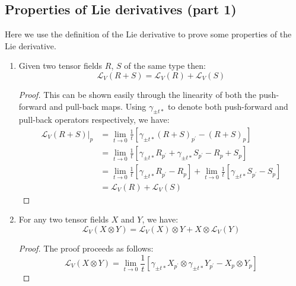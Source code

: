     \subsection{Properties of Lie derivatives (part 1)}
      Here we use the definition of the Lie derivative to prove some
      properties of the Lie derivative.
        \begin{enumerate}
          \item{Given two tensor fields $R$, $S$ of the same type then:
          \begin{equation}
            \label{eqn: Lie derivative linearity}
            \mathcal{L}_V(R+S) = \mathcal{L}_V(R) + \mathcal{L}_V(S)
          \end{equation}
          \begin{proof}
            This can be shown easily through the linearity of both the
            push-forward and pull-back maps. Using $\gamma_{\pm t*}$ to denote
            both push-forward and pull-back operators respectively, we have:
            \begin{align*}
              \mathcal{L}_V(R+S)\Bigr|_p 
              &= \lim_{t\to 0}\frac{1}{t}\left[\gamma_{\pm
              t*}(R+S)_{p^\prime} - (R+S)_p\right] \\
              &= \lim_{t\to 0}\frac{1}{t}\left[\gamma_{\pm
              t*}R_{p^\prime}+\gamma_{\pm
              t*}S_{p^\prime} - R_p+S_p\right] \\
              &= \lim_{t\to 0}\frac{1}{t}\left[\gamma_{\pm t*}R_{p^\prime}-
              R_p \right]
              +\lim_{t\to 0}\frac{1}{t}\left[\gamma_{\pm
              t*}S_{p^\prime} - S_p\right] \\
              &= \mathcal{L}_V(R) + \mathcal{L}_V(S)
            \end{align*}
          \end{proof}}
          \item{For any two tensor fields $X$ and $Y$, we have:
          \begin{equation}
            \label{eqn: Lie derivative Leibniz rule}
            \mathcal{L}_V(X \otimes Y) = \mathcal{L}_V(X) \otimes Y + X
            \otimes \mathcal{L}_V(Y)
          \end{equation}
          \begin{proof}
            The proof proceeds as follows:
              \[\mathcal{L}_V(X \otimes Y) = \lim_{t \to
              0}\frac{1}{t}\left[\gamma_{\pm t*}X_{p^\prime} \otimes
              \gamma_{\pm t*}Y_{p^\prime} - X_p \otimes Y_p\right]\]

\end{proof}}
\end{enumerate}

